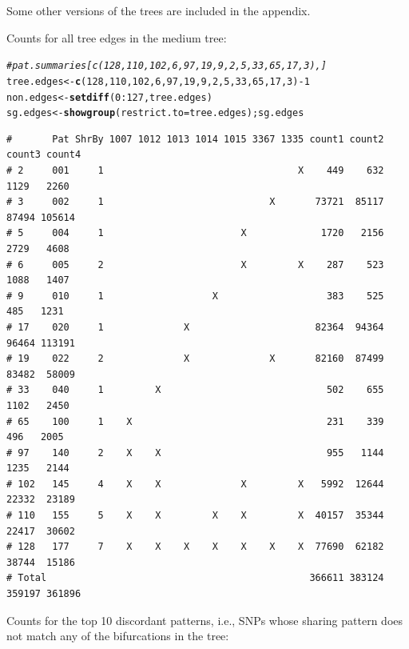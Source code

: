 \documentclass{article}\usepackage[]{graphicx}\usepackage[]{color}
\makeatletter
\newcommand{\hlnum}[1]{\textcolor[rgb]{0.686,0.059,0.569}{#1}}%
\newcommand{\hlcom}[1]{\textcolor[rgb]{0.678,0.584,0.686}{\textit{#1}}}%
\newcommand{\hlopt}[1]{\textcolor[rgb]{0,0,0}{#1}}%
\newcommand{\hlstd}[1]{\textcolor[rgb]{0.345,0.345,0.345}{#1}}%
\newcommand{\hlkwb}[1]{\textcolor[rgb]{0.69,0.353,0.396}{#1}}%
\newcommand{\hlkwc}[1]{\textcolor[rgb]{0.333,0.667,0.333}{#1}}%
\newcommand{\hlkwd}[1]{\textcolor[rgb]{0.737,0.353,0.396}{\textbf{#1}}}%
\newenvironment{kframe}{%
 \def\at@end@of@kframe{}%
 \ifinner\ifhmode%
  \def\at@end@of@kframe{\end{minipage}}%
  \begin{minipage}{\columnwidth}%
 \fi\fi%
 \def\FrameCommand##1{\hskip\@totalleftmargin \hskip-\fboxsep
 \colorbox{shadecolor}{##1}\hskip-\fboxsep
     \hskip-\linewidth \hskip-\@totalleftmargin \hskip\columnwidth}%
 \MakeFramed {\advance\hsize-\width
   \@totalleftmargin\z@ \linewidth\hsize
   \@setminipage}}%
 {\par\unskip\endMakeFramed%
 \at@end@of@kframe}
\newenvironment{knitrout}{}{} %
\makeatother
\begin{document}
Some other versions of the trees are included in the appendix.

Counts for all tree edges in the medium tree: 

\begin{knitrout}\scriptsize
{}\color{fgcolor}\begin{kframe}
\begin{alltt}
\hlcom{#pat.summaries[c(128,110,102,6,97,19,9,2,5,33,65,17,3),]}
\hlstd{tree.edges} \hlkwb{<-} \hlkwd{c}\hlstd{(}\hlnum{128}\hlstd{,}\hlnum{110}\hlstd{,}\hlnum{102}\hlstd{,}\hlnum{6}\hlstd{,}\hlnum{97}\hlstd{,}\hlnum{19}\hlstd{,}\hlnum{9}\hlstd{,}\hlnum{2}\hlstd{,}\hlnum{5}\hlstd{,}\hlnum{33}\hlstd{,}\hlnum{65}\hlstd{,}\hlnum{17}\hlstd{,}\hlnum{3}\hlstd{)}\hlopt{-}\hlnum{1}
\hlstd{non.edges} \hlkwb{<-} \hlkwd{setdiff}\hlstd{(}\hlnum{0}\hlopt{:}\hlnum{127}\hlstd{, tree.edges)}
\hlstd{sg.edges} \hlkwb{<-} \hlkwd{showgroup}\hlstd{(}\hlkwc{restrict.to}\hlstd{=tree.edges) ; sg.edges}
\end{alltt}
\begin{verbatim}
#       Pat ShrBy 1007 1012 1013 1014 1015 3367 1335 count1 count2 count3 count4
# 2     001     1                                  X    449    632   1129   2260
# 3     002     1                             X       73721  85117  87494 105614
# 5     004     1                        X             1720   2156   2729   4608
# 6     005     2                        X         X    287    523   1088   1407
# 9     010     1                   X                   383    525    485   1231
# 17    020     1              X                      82364  94364  96464 113191
# 19    022     2              X              X       82160  87499  83482  58009
# 33    040     1         X                             502    655   1102   2450
# 65    100     1    X                                  231    339    496   2005
# 97    140     2    X    X                             955   1144   1235   2144
# 102   145     4    X    X              X         X   5992  12644  22332  23189
# 110   155     5    X    X         X    X         X  40157  35344  22417  30602
# 128   177     7    X    X    X    X    X    X    X  77690  62182  38744  15186
# Total                                              366611 383124 359197 361896
\end{verbatim}
\end{kframe}
\end{knitrout}

Counts for the top 10 discordant patterns, i.e., SNPs whose sharing pattern does not match any of the bifurcations in the tree:
\end{document}

